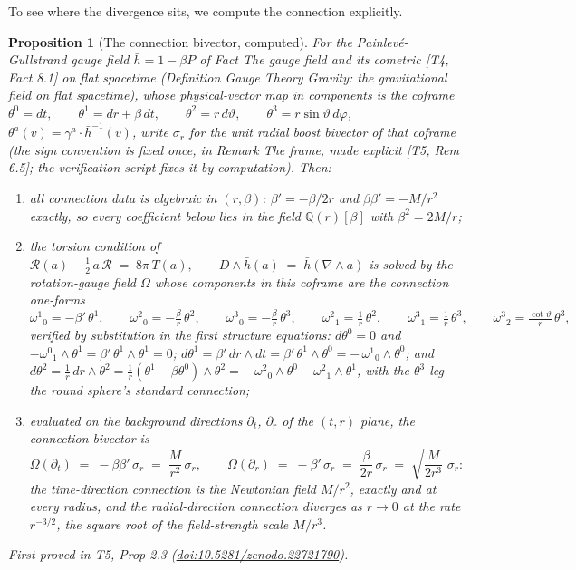 \documentclass[11pt]{article}
\newtheorem{proposition}[theorem]{Proposition}
\theoremstyle{definition}
\theoremstyle{plain}
\providecommand{\hb}{}\renewcommand{\hb}{\bar{h}}
\begin{document}
To see where the divergence sits, we compute the connection explicitly.

\begin{proposition}[The connection bivector, computed]\label{c:singularity.connection-bivector-computed}
For the Painlev\'e-Gullstrand gauge field $\hb = 1 - \beta P$ of Fact \emph{The gauge field and its cometric} [T4, Fact 8.1] on flat spacetime (Definition \emph{Gauge Theory Gravity: the gravitational field on flat spacetime}), whose physical-vector map in components is the coframe $\theta^0 = dt, \qquad \theta^1 = dr + \beta\,dt, \qquad \theta^2 = r\,d\vartheta, \qquad \theta^3 = r\sin\vartheta\,d\varphi$, $\theta^a(v) = \gamma^a \cdot \hb^{-1}(v)$, write $\sigma_r$ for the unit radial boost bivector of that coframe (the sign convention is fixed once, in Remark \emph{The frame, made explicit} [T5, Rem 6.5]; the verification script fixes it by computation). Then:
\begin{enumerate}
\item all connection data is algebraic in $(r, \beta)$: $\beta' = -\beta/2r$ and $\beta\beta' = -M/r^2$ exactly, so every coefficient below lies in the field $\mathbb{Q}(r)[\beta]$ with $\beta^2 = 2M/r$;
\item the torsion condition of $\mathcal{R}(a) - \tfrac12\, a\, \mathcal{R} \;=\; 8\pi\, T(a), \qquad D \wedge \hb(a) \;=\; \hb(\nabla \wedge a)$ is solved by the rotation-gauge field $\Omega$ whose components in this coframe are the connection one-forms
\[
\omega^1{}_0 = -\beta'\,\theta^1, \qquad
\omega^2{}_0 = -\tfrac{\beta}{r}\,\theta^2, \qquad
\omega^3{}_0 = -\tfrac{\beta}{r}\,\theta^3, \qquad
\omega^2{}_1 = \tfrac{1}{r}\,\theta^2, \qquad
\omega^3{}_1 = \tfrac{1}{r}\,\theta^3, \qquad
\omega^3{}_2 = \tfrac{\cot\vartheta}{r}\,\theta^3,
\]
verified by substitution in the first structure equations: $d\theta^0 = 0$ and $-\omega^0{}_1 \wedge \theta^1 = \beta'\,\theta^1 \wedge \theta^1 = 0$; $d\theta^1 = \beta'\,dr\wedge dt = \beta'\,\theta^1\wedge\theta^0 = -\,\omega^1{}_0\wedge\theta^0$; and $d\theta^2 = \tfrac1r\,dr\wedge\theta^2 = \tfrac1r(\theta^1 - \beta\theta^0)\wedge\theta^2 = -\,\omega^2{}_0\wedge\theta^0 - \omega^2{}_1\wedge\theta^1$, with the $\theta^3$ leg the round sphere's standard connection;
\item evaluated on the background directions $\partial_t$, $\partial_r$ of the $(t,r)$ plane, the connection bivector is
\[
\Omega(\partial_t) \;=\; -\beta\beta'\,\sigma_r \;=\; \frac{M}{r^2}\,\sigma_r ,
\qquad
\Omega(\partial_r) \;=\; -\beta'\,\sigma_r \;=\; \frac{\beta}{2r}\,\sigma_r \;=\; \sqrt{\frac{M}{2r^3}}\;\sigma_r :
\]
the time-direction connection is the Newtonian field $M/r^2$, exactly and at every radius, and the radial-direction connection diverges as $r \to 0$ at the rate $r^{-3/2}$, the square root of the field-strength scale $M/r^3$.
\end{enumerate}
\emph{First proved in} T5, Prop 2.3 (\href{https://doi.org/10.5281/zenodo.22721790}{doi:10.5281/zenodo.22721790}).
\end{proposition}
\end{document}
